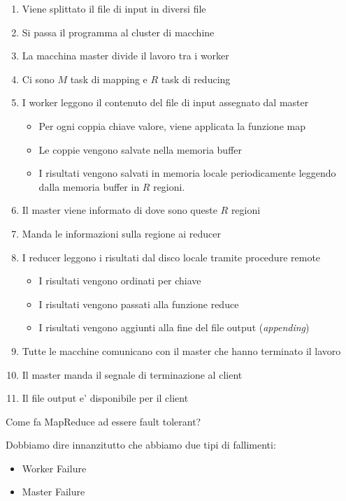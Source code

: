 \begin{enumerate}
    \item Viene splittato il file di input in diversi file 
    \item Si passa il programma al cluster di macchine
    \item La macchina master divide il lavoro tra i worker
    \item Ci sono $M$ task di mapping e $R$ task di reducing
    \item I worker leggono il contenuto del file di input assegnato dal master
    \begin{itemize}
        \item Per ogni coppia chiave valore, viene applicata la funzione map
        \item Le coppie vengono salvate nella memoria buffer
        \item I risultati vengono salvati in memoria locale periodicamente leggendo dalla memoria buffer in $R$ regioni.
    \end{itemize}
    \item Il master viene informato di dove sono queste $R$ regioni
    \item Manda le informazioni sulla regione ai reducer
    \item I reducer leggono i risultati dal disco locale tramite procedure remote 
    \begin{itemize}
        \item I risultati vengono ordinati per chiave
        \item I risultati vengono passati alla funzione reduce
        \item I risultati vengono aggiunti alla fine del file output (\textit{appending})
    \end{itemize}
    \item Tutte le macchine comunicano con il master che hanno terminato il lavoro
    \item Il master manda il segnale di terminazione al client
    \item Il file output e' disponibile per il client
\end{enumerate}

\begin{domanda}
    Come fa MapReduce ad essere fault tolerant?
\end{domanda}

Dobbiamo dire innanzitutto che abbiamo due tipi di fallimenti:
\begin{itemize}
    \item Worker Failure
    \item Master Failure
\end{itemize}

